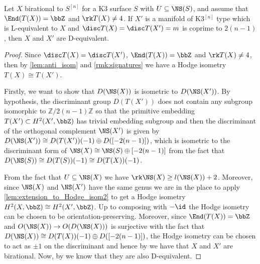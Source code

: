 \documentclass{amsart}
\begin{document}
\begin{proposition}\label{prop:hillbert_scheme}
    Let \(X\) birational to \(S^{[n]}\) for a K3 surface \(S\) with \(U\subseteq \NS(S)\), and assume that \(\End(T(X))=\bbZ\) and \(\rk T(X)\not= 4\). If \(X'\) is a manifold of K3\(^{[n]}\) type which is L-equivalent to \(X\) and \(\disc T(X)=\disc T(X')=m\) is coprime to \(2(n-1)\), then \(X\) and \(X'\) are D-equivalent.
\end{proposition}

\begin{proof}
Since \(\disc T(X)=\disc T(X')\), \(\End(T(X))=\bbZ\) and \(\rk T(X)\not=4\), then by \autoref{lem:anti_isom} and \autoref{rmk:signatures} we have a Hodge isometry \(T(X)\cong T(X')\).


   
    
    
    Firstly, we want to show that \(D({\NS(X)})\) is isometric to \(D({\NS(X')})\).
    By hypothesis, the discriminant group \(D({T(X')})\) does not contain any subgroup isomorphic to \(\mathbb{Z}/2(n-1)\mathbb{Z}\) so that the primitive embedding \(T(X')\subset H^2(X',\bbZ)\) has trivial embedding subgroup and then the discriminant of the orthogonal complement \( \NS(X')\) is given by \(D({\NS(X')})\cong D({T(X')})(-1)\oplus D({[-2(n-1)]})\), which is isometric to the discriminant form of \(\NS(X)\cong \NS(S)\oplus [-2(n-1)]\) from the fact that \(D(\NS(S))\cong D(T(S))(-1)\cong D(T(X))(-1)\).
    
    From the fact that \(U \subseteq \NS(X)\) we have \(\rk \NS(X)\geq l(\NS(X))+2\). 
Moreover, since \(\NS(X)\) and \(\NS(X')\) have the same genus we are in the place to apply \autoref{lem:extension_to_Hodge_isom2} to get a Hodge isometry \(H^2(X,\bbZ)\cong H^2(X',\bbZ)\). Up to composing with \(-\id\) the Hodge isometry can be chosen to be orientation-preserving. Moreover, since \(\End(T(X))=\bbZ\) and \(O(\NS(X))\to O(D(\NS(X)))\) is surjective with the fact that \(D({\NS(X)})\cong D({T(X)})(-1)\oplus D({[-2(n-1)]})\), the Hodge isometry can be chosen to act as \(\pm 1\) on the discriminant and hence by \cite[Corollary 9.9]{markman2011survey} we have that \(X\) and \(X'\) are birational. Now, by \cite[Theorem 1.2]{maulik2025d} we know that they are also D-equivalent.

  
     
\end{proof}















\color{black}




 

 
\end{document}
